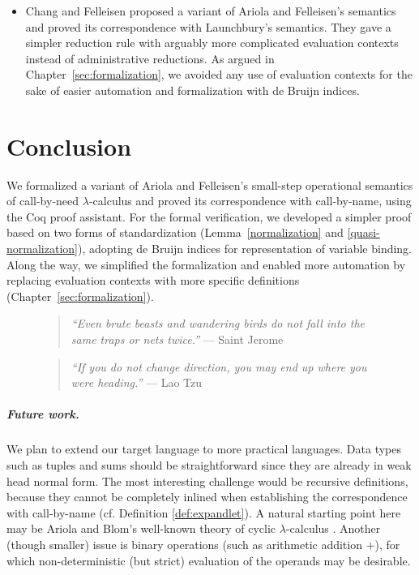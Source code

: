 \documentclass[english]{sumiilab-paper}
\newcommand{\EXPANDLET}[1]{#1^\pitchfork}
\newcommand{\lemmaname}{Lemma}
\begin{document}
\begin{itemize}
Although we did not directly adopt Maraist et al.'s formalism,
it influenced our correspondence $\EXPANDLET{M}$ of call-by-need terms with call-by-name, and our measure function in the proof of \lemmaname~\ref{lemma:VCA-terminates}.

\item
Chang and Felleisen \cite{Chang12} proposed a variant of Ariola and Felleisen's semantics and proved its correspondence with Launchbury's semantics.
They gave a simpler reduction rule with arguably more complicated evaluation contexts instead of administrative reductions.
As argued in Chapter~\ref{sec:formalization},
we avoided any use of evaluation contexts for the sake of easier automation and formalization with de Bruijn indices.
\end{itemize}

\chapter{Conclusion}\label{sec:conclusion}
%
We formalized a variant of Ariola and Felleisen's small-step operational semantics of call-by-need $\lambda$-calculus and proved its correspondence with call-by-name, using the Coq proof assistant.
For the formal verification,
we developed a simpler proof based on two forms of standardization (\lemmaname~\ref{normalization} and \ref{quasi-normalization}),
adopting de Bruijn indices for representation of variable binding.
Along the way, we simplified the formalization and enabled more automation by replacing evaluation contexts with more specific definitions (Chapter~\ref{sec:formalization}).
%
\begin{figure}[b]
	\begin{quote}
		\textit{``Even brute beasts and wandering birds do not fall into the same traps or nets twice.''} --- Saint Jerome
	\end{quote}
	\begin{quote}
		\textit{``If you do not change direction, you may end up where you were heading.''} --- Lao Tzu
	\end{quote}
%
\end{figure}

\paragraph{Future work.}
%
We plan to extend our target language to more practical languages.
Data types such as tuples and sums should be straightforward since they are already in weak head normal form.
The most interesting challenge would be recursive definitions, because they cannot be completely inlined when establishing the correspondence with call-by-name (cf. Definition \ref{def:expandlet}).
A natural starting point here may be Ariola and Blom's well-known theory of cyclic $\lambda$-calculus \cite{Ariola:1997}.
Another (though smaller) issue is binary operations (such as arithmetic addition $+$), for which non-deterministic (but strict) evaluation of the operands may be desirable.
%
\end{document}
